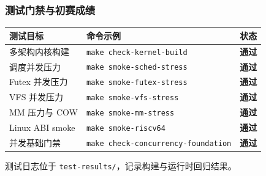\documentclass[aspectratio=1610]{beamer}
\newcommand{\code}[1]{\texttt{\footnotesize #1}}
\newcommand{\high}[1]{\textbf{\textcolor{ThemeColor}{#1}}}
\begin{document}
\begin{frame}
    \frametitle{测试门禁与初赛成绩}
    \begin{table}
        \centering
        \footnotesize
        \renewcommand{\arraystretch}{1.2}
        \begin{tabular}{lll}
            \toprule
            \textbf{测试目标} & \textbf{命令示例} & \textbf{状态} \\
            \midrule
            多架构内核构建 & \code{make check-kernel-build} & \high{通过} \\
            调度并发压力 & \code{make smoke-sched-stress} & \high{通过} \\
            Futex 并发压力 & \code{make smoke-futex-stress} & \high{通过} \\
            VFS 并发压力 & \code{make smoke-vfs-stress} & \high{通过} \\
            MM 压力与 COW & \code{make smoke-mm-stress} & \high{通过} \\
            Linux ABI smoke & \code{make smoke-riscv64} & \high{通过} \\
            并发基础门禁 & \code{make check-concurrency-foundation} & \high{通过} \\
            \bottomrule
        \end{tabular}
    \end{table}
    \vspace{0.3em}
    \begin{center}
        \small 测试日志位于 \code{test-results/}，记录构建与运行时回归结果。
    \end{center}
\end{frame}
\end{document}
